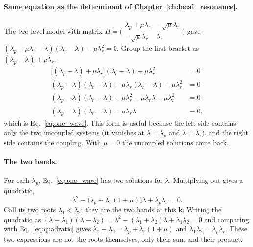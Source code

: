 \paragraph{Same equation as the determinant of Chapter~\ref{ch:local_resonance}.}
The two-level model with matrix
$H = \bigl(\begin{smallmatrix}\lambda_p+\mu\lambda_r & -\sqrt{\mu}\lambda_r\\ -\sqrt{\mu}\lambda_r & \lambda_r\end{smallmatrix}\bigr)$
gave $(\lambda_p + \mu\lambda_r - \lambda)(\lambda_r - \lambda) - \mu\lambda_r^2 = 0$.
Group the first bracket as $(\lambda_p - \lambda) + \mu\lambda_r$:
\begin{align}
  \bigl[(\lambda_p - \lambda) + \mu\lambda_r\bigr](\lambda_r - \lambda) - \mu\lambda_r^2 &= 0 \\
  (\lambda_p - \lambda)(\lambda_r - \lambda) + \mu\lambda_r(\lambda_r - \lambda) - \mu\lambda_r^2 &= 0 \\
  (\lambda_p - \lambda)(\lambda_r - \lambda) + \mu\lambda_r^2 - \mu\lambda_r\lambda - \mu\lambda_r^2 &= 0 \\
  (\lambda_p - \lambda)(\lambda_r - \lambda) - \mu\lambda_r\lambda &= 0 ,
\end{align}
which is Eq.~\eqref{eq:one_wave}. This form is useful because the left side
contains only the two uncoupled systems (it vanishes at $\lambda = \lambda_p$
and $\lambda = \lambda_r$), and the right side contains the coupling. With
$\mu = 0$ the uncoupled solutions come back.

\paragraph{The two bands.}
For each $\lambda_p$, Eq.~\eqref{eq:one_wave} has two solutions for $\lambda$.
Multiplying out gives a quadratic,
\begin{equation}
  \lambda^2 - \bigl(\lambda_p + \lambda_r(1+\mu)\bigr)\lambda + \lambda_p\lambda_r = 0 .
  \label{eq:quadratic}
\end{equation}
Call its two roots $\lambda_1 < \lambda_2$; they are the two bands at this $\mathbf{k}$. Writing the quadratic as $(\lambda - \lambda_1)(\lambda - \lambda_2) = \lambda^2 - (\lambda_1 + \lambda_2)\lambda + \lambda_1\lambda_2 = 0$ and comparing with Eq.~\eqref{eq:quadratic} gives $\lambda_1 + \lambda_2 = \lambda_p + \lambda_r(1+\mu)$ and $\lambda_1\lambda_2 = \lambda_p\lambda_r$. These two expressions are not the roots themselves, only their sum and their product.

